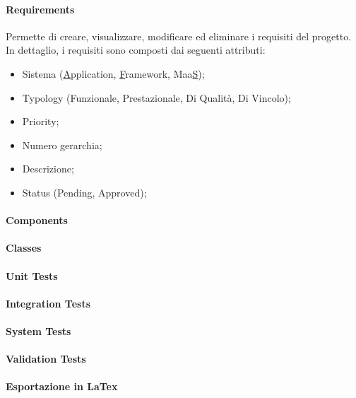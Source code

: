      \paragraph{Requirements}
     Permette di creare, visualizzare, modificare ed eliminare i requisiti del progetto. 
     In dettaglio, i requisiti sono composti dai seguenti attributi:
     \begin{itemize}
     	\item Sistema (\underline{A}pplication, \underline{F}ramework, Maa\underline{S});
     	\item Typology (Funzionale, Prestazionale, Di Qualità, Di Vincolo);
     	\item Priority;
     	\item Numero gerarchia;
     	\item Descrizione;
     	\item Status (Pending, Approved);
     \end{itemize}
     
     \paragraph{Components}
     
     \paragraph{Classes}
     \paragraph{Unit Tests}
     \paragraph{Integration Tests}
     \paragraph{System Tests}
     \paragraph{Validation Tests}
     \paragraph{Esportazione in LaTex}
   
